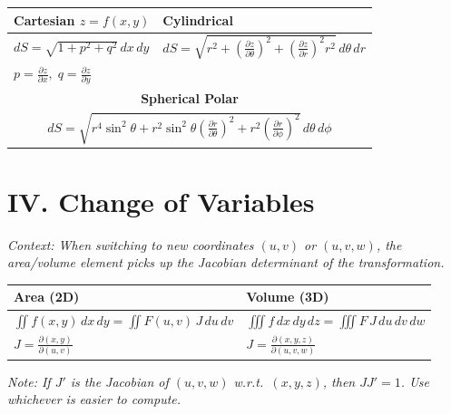 \documentclass[11pt, a4paper]{article}
\begin{document}
\begin{center}
\begin{tabular}{@{}p{} p{}@{}}
\toprule
\textbf{Cartesian $z=f(x,y)$} & \textbf{Cylindrical} \\
\midrule
$dS = \sqrt{1+p^2+q^2}\,dx\,dy$ & $dS = \sqrt{r^2 + \left(\frac{\partial z}{\partial \theta}\right)^2 + \left(\frac{\partial z}{\partial r}\right)^2 r^2}\,d\theta\,dr$ \\
$p = \frac{\partial z}{\partial x},\; q = \frac{\partial z}{\partial y}$ & \\
\midrule
\multicolumn{2}{c}{\textbf{Spherical Polar}} \\
\midrule
\multicolumn{2}{c}{$dS = \sqrt{r^4\sin^2\theta + r^2\sin^2\theta\left(\frac{\partial r}{\partial \theta}\right)^2 + r^2\left(\frac{\partial r}{\partial \phi}\right)^2}\,d\theta\,d\phi$} \\
\bottomrule
\end{tabular}
\end{center}

\vspace{0.3cm}

\section*{\color{primary} IV. Change of Variables}

\textit{\small Context: When switching to new coordinates $(u,v)$ or $(u,v,w)$, the area/volume element picks up the Jacobian determinant of the transformation.}

\begin{center}
\begin{tabular}{@{}p{} p{}@{}}
\toprule
\textbf{Area (2D)} & \textbf{Volume (3D)} \\
\midrule
$\displaystyle\iint f(x,y)\,dx\,dy = \iint F(u,v)\,J\,du\,dv$ & $\displaystyle\iiint f\,dx\,dy\,dz = \iiint F\,J\,du\,dv\,dw$ \\
$J = \frac{\partial(x,y)}{\partial(u,v)}$ & $J = \frac{\partial(x,y,z)}{\partial(u,v,w)}$ \\
\bottomrule
\end{tabular}
\end{center}

\vspace{0.2cm}

\textit{\small Note: If $J'$ is the Jacobian of $(u,v,w)$ w.r.t.\ $(x,y,z)$, then $JJ'=1$. Use whichever is easier to compute.}
\end{document}
